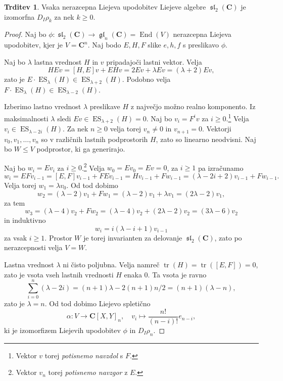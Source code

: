 \documentclass[11pt]{book}
\def\CC{\mathbf{C}}
\DeclareMathOperator\tr{tr}
\DeclareMathOperator\Eigenspace{ES}
\DeclareMathOperator\glfrak{\mathfrak{gl}}
\DeclareMathOperator\slfrak{\mathfrak{sl}}
\DeclareMathOperator\End{End}
\theoremstyle{definition}
\theoremstyle{zgled}
\theoremstyle{odprtproblem}
\theoremstyle{domacanaloga}
\newenvironment{dokaz}
    {\color{siva}\begin{proof}}
    {\end{proof}}
\theoremstyle{izrek}
\newtheorem*{trditev}{Trditev}
\begin{document}
\begin{trditev}
Vsaka nerazcepna Liejeva upodobitev Liejeve algebre $\slfrak_2(\CC)$ je izomorfna $D_I \rho_k$ za nek $k \geq 0$.
\end{trditev}
\begin{dokaz}
Naj bo $\phi \colon \slfrak_2(\CC) \to \glfrak_n(\CC) = \End(V)$ nerazcepna Liejeva upodobitev, kjer je $V = \CC^n$. Naj bodo $E,H,F$ slike $e,h,f$ s preslikavo $\phi$.

Naj bo $\lambda$ lastna vrednost $H$ in $v$ pripadajoči lastni vektor. Velja
\[
    HEv = [H,E]v + EHv = 2 E v + \lambda E v = (\lambda + 2) Ev,
\]
zato je $E \cdot \Eigenspace_{\lambda}(H) \in \Eigenspace_{\lambda + 2}(H)$. Podobno velja $F \cdot \Eigenspace_{\lambda}(H) \in \Eigenspace_{\lambda - 2}(H)$. 

Izberimo lastno vrednost $\lambda$ preslikave $H$ z največjo možno realno komponento.
Iz maksimalnosti $\lambda$ sledi $Ev \in \Eigenspace_{\lambda + 2}(H) = 0$. Naj bo $v_i = F^i v$ za $i \geq 0$.\footnote{Vektor $v$ torej \emph{potisnemo navzdol} s $F$.} Velja $v_i \in \Eigenspace_{\lambda - 2i}(H)$. Za nek $n \geq 0$ velja torej $v_n \neq 0$ in $v_{n+1} = 0$. Vektorji $v_0, v_1, \dots, v_n$ so v različnih lastnih podprostorih $H$, zato so linearno neodvisni. Naj bo $W \leq V$ podprostor, ki ga generirajo.

Naj bo $w_i = E v_i$ za $i \geq 0$.\footnote{Vektor $v_n$ torej \emph{potisnemo navzgor} z $E$.} Velja $w_0 = E v_0 = Ev = 0$, za $i \geq 1$ pa izračunamo
\[
    w_i 
    = E F v_{i-1}
    = [E,F] v_{i-1} + FE v_{i-1}
    = H v_{i-1} + F w_{i-1}
    = (\lambda - 2i + 2) v_{i-1} + F w_{i-1}.
\]
Velja torej $w_1 = \lambda v_0$. Od tod dobimo
\[
    w_2 = (\lambda - 2) v_1 + F w_1
    = (\lambda - 2) v_1 + \lambda v_1
    = (2 \lambda - 2) v_1,
\]
za tem
\[
    w_3 = (\lambda - 4) v_2 + F w_2
    = (\lambda - 4) v_2 + (2\lambda - 2) v_2
    = (3 \lambda - 6) v_2
\]
in induktivno
\[
    w_i = i (\lambda - i + 1) v_{i-1}
\]
za vsak $i \geq 1$. Prostor $W$ je torej invarianten za delovanje $\slfrak_2(\CC)$, zato po nerazcepnosti velja $V = W$.

Lastna vrednost $\lambda$ ni čisto poljubna. Velja namreč $\tr(H) = \tr([E,F]) = 0$, zato je vsota vseh lastnih vrednosti $H$ enaka $0$. Ta vsota je ravno
\[
    \sum_{i = 0}^n (\lambda - 2i) = (n+1) \lambda - 2 (n+1)n/2
    = (n+1)(\lambda - n),
\]
zato je $\lambda = n$. Od tod dobimo Liejevo spletično
\[
    \alpha \colon V \to \CC[X,Y]_n, \quad
    v_i \mapsto \frac{n!}{(n-i)!} e_{n-i},
\]
ki je izomorfizem Liejevih upodobitev $\phi$ in $D_I \rho_n$.
\end{dokaz}
\end{document}
